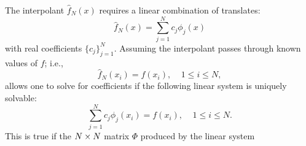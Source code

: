    The interpolant $\hat{f}_N(x)$ requires a linear combination of translates:  
        \begin{equation*}
        \hat{f}_N(x) = \sum_{j=1}^{N} c_j \phi_j(x)
        \end{equation*}
    with real coefficients $\{c_j\}_{j=1}^{N}$. Assuming the interpolant passes through
    known values of $f$; i.e., 
        \begin{equation*} 
        \hat{f}_N(x_i) = f(x_i),\ \ \ \ \ 1 \leq i \leq N, 
        \end{equation*}
    allows one to solve for coefficients if the following linear system is uniquely
    solvable: 
        \begin{equation*} 
        \sum_{j=1}^{N} c_j \phi_j(x_i) = f(x_i),\ \ \ \ \ 1
        \leq i \leq N. 
        \end{equation*} 
    This is true if the $N \times N$ matrix $\Phi$ produced by the linear system
